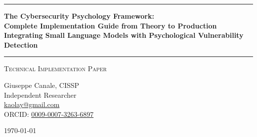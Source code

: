 \documentclass[11pt,a4paper]{article}
\begin{document}
\thispagestyle{empty}
\begin{center}

\vspace*{0.5cm}

\rule{\textwidth}{1.5pt}

\vspace{0.5cm}

{\LARGE \textbf{The Cybersecurity Psychology Framework:}}\\[0.3cm]
{\LARGE \textbf{Complete Implementation Guide from Theory to Production}}\\[0.3cm]
{\LARGE \textbf{Integrating Small Language Models with Psychological Vulnerability Detection}}

\vspace{0.5cm}

\rule{\textwidth}{1.5pt}

\vspace{0.3cm}

{\large \textsc{Technical Implementation Paper}}

\vspace{0.5cm}

{\Large Giuseppe Canale, CISSP}\\[0.2cm]
Independent Researcher\\[0.1cm]
\href{mailto:kaolay@gmail.com}{kaolay@gmail.com}\\[0.1cm]
ORCID: \href{https://orcid.org/0009-0007-3263-6897}{0009-0007-3263-6897}

\vspace{0.8cm}

{\large \today}

\vspace{1cm}

\end{center}
\end{document}
